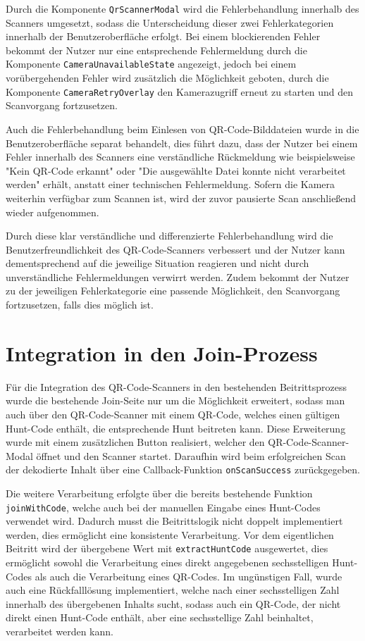 ﻿\documentclass[oneside]{ausarbeitung}
\begin{document}
Durch die Komponente \texttt{QrScannerModal} wird die Fehlerbehandlung innerhalb des Scanners umgesetzt, sodass die Unterscheidung dieser zwei
Fehlerkategorien innerhalb der Benutzeroberfläche erfolgt. Bei einem blockierenden Fehler bekommt der Nutzer nur eine entsprechende Fehlermeldung 
durch die Komponente \texttt{CameraUnavailableState} angezeigt, jedoch bei einem vorübergehenden Fehler wird zusätzlich die Möglichkeit geboten, durch 
die Komponente \texttt{CameraRetryOverlay} den Kamerazugriff erneut zu starten und den Scanvorgang fortzusetzen.

Auch die Fehlerbehandlung beim Einlesen von QR-Code-Bilddateien wurde in die Benutzeroberfläche separat behandelt, dies führt dazu, dass der Nutzer
bei einem Fehler innerhalb des Scanners eine verständliche Rückmeldung wie beispielsweise "Kein QR-Code erkannt" oder "Die ausgewählte Datei konnte 
nicht verarbeitet werden" erhält, anstatt einer technischen Fehlermeldung. Sofern die Kamera weiterhin verfügbar zum Scannen ist, wird der zuvor
pausierte Scan anschließend wieder aufgenommen.

Durch diese klar verständliche und differenzierte Fehlerbehandlung wird die Benutzerfreundlichkeit des QR-Code-Scanners verbessert und der Nutzer 
kann dementsprechend auf die jeweilige Situation reagieren und nicht durch unverständliche Fehlermeldungen verwirrt werden. Zudem bekommt der Nutzer
zu der jeweiligen Fehlerkategorie eine passende Möglichkeit, den Scanvorgang fortzusetzen, falls dies möglich ist.


\section{Integration in den Join-Prozess}
\label{sec:implementierung-join}

Für die Integration des QR-Code-Scanners in den bestehenden Beitrittsprozess wurde die bestehende Join-Seite nur um die Möglichkeit erweitert,
sodass man auch über den QR-Code-Scanner mit einem QR-Code, welches einen gültigen Hunt-Code enthält, die entsprechende Hunt beitreten kann.
Diese Erweiterung wurde mit einem zusätzlichen Button realisiert, welcher den QR-Code-Scanner-Modal öffnet und den Scanner startet. Daraufhin
wird beim erfolgreichen Scan der dekodierte Inhalt über eine Callback-Funktion \texttt{onScanSuccess} zurückgegeben.

Die weitere Verarbeitung erfolgte über die bereits bestehende Funktion \texttt{joinWithCode}, welche auch bei der manuellen Eingabe eines
Hunt-Codes verwendet wird. Dadurch musst die Beitrittslogik nicht doppelt implementiert werden, dies ermöglicht eine konsistente Verarbeitung.
Vor dem eigentlichen Beitritt wird der übergebene Wert mit \texttt{extractHuntCode} ausgewertet, dies ermöglicht sowohl die Verarbeitung eines
direkt angegebenen sechsstelligen Hunt-Codes als auch die Verarbeitung eines QR-Codes. Im ungünstigen Fall, wurde auch eine Rückfalllösung
implementiert, welche nach einer sechsstelligen Zahl innerhalb des übergebenen Inhalts sucht, sodass auch ein QR-Code, der nicht direkt 
einen Hunt-Code enthält, aber eine sechsstellige Zahl beinhaltet, verarbeitet werden kann.
\end{document}
